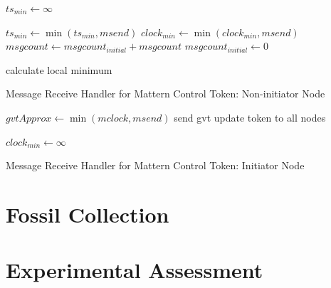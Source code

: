 \documentclass[11pt]{book}
\begin{document}
\begin{algorithm}
\DontPrintSemicolon
\SetAlgoVlined
{}

   {
    $ts_{min} \gets \infty$\;
     
  }

  $ts_{min} \gets \min{(ts_{min}, msend)}$\;
  $clock_{min} \gets \min{(clock_{min}, msend)}$
  $msgcount \gets msgcount_{initial} + msgcount$\;
  $msgcount_{initial} \gets 0$\;

  calculate local minimum\;

  \;

\caption{Message Receive Handler for Mattern Control Token: Non-initiator Node}
\end{algorithm}

\begin{algorithm}
\DontPrintSemicolon
\SetAlgoVlined
{}

   {
    $gvtApprox \gets \min{(mclock, msend)}$\;
    send gvt update token to all nodes\;

     

    $clock_{min} \gets \infty$\;
  } 

\caption{Message Receive Handler for Mattern Control Token: Initiator Node}
\end{algorithm}


\section{Fossil Collection}


\section{Experimental Assessment}
\end{document}
